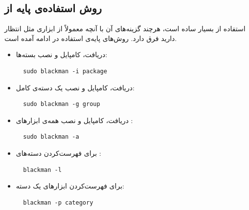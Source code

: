 \documentclass[a4paper, oneside, 11pt]{book}
\begin{document}
\subsection{روش استفاده‌ی پایه از } استفاده از  بسیار ساده است،
هرچند گزینه‌های آن با آنچه معمولاً از ابزاری مثل  انتظار دارید فرق دارد.
روش‌های پایه‌ی استفاده در ادامه آمده است.
\begin{itemize}
\item دریافت، کامپایل و نصب بسته‌ها:
\begin{latin}
\begin{lstlisting}
  sudo blackman -i package
\end{lstlisting}
\end{latin}

\item دریافت، کامپایل و نصب یک دسته‌ی کامل:
\begin{latin}
\begin{lstlisting}
  sudo blackman -g group
\end{lstlisting}
\end{latin}

\item دریافت، کامپایل و نصب همه‌ی ابزارهای :
\begin{latin}
\begin{lstlisting}
  sudo blackman -a
\end{lstlisting}
\end{latin}

\item برای فهرست‌کردن دسته‌های :
\begin{latin}
\begin{lstlisting}
  blackman -l
\end{lstlisting}
\end{latin}

\item برای فهرست‌کردن ابزارهای یک دسته:
\begin{latin}
\begin{lstlisting}
  blackman -p category
\end{lstlisting}
\end{latin}

\end{itemize}
\end{document}
